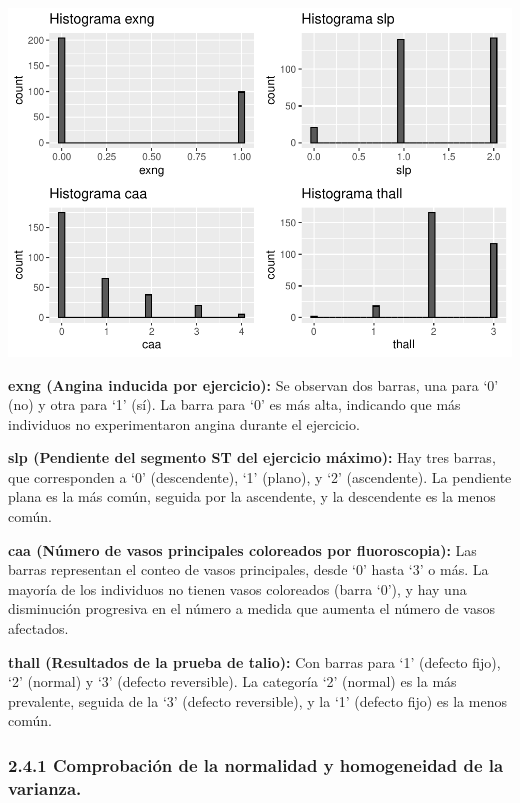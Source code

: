 \documentclass[
]{article}
\begin{document}
\includegraphics{coyolaf_ChristianOyola-PRA2_files/figure-latex/unnamed-chunk-13-1.pdf}

\textbf{exng (Angina inducida por ejercicio):} Se observan dos barras,
una para `0' (no) y otra para `1' (sí). La barra para `0' es más alta,
indicando que más individuos no experimentaron angina durante el
ejercicio.

\textbf{slp (Pendiente del segmento ST del ejercicio máximo):} Hay tres
barras, que corresponden a `0' (descendente), `1' (plano), y `2'
(ascendente). La pendiente plana es la más común, seguida por la
ascendente, y la descendente es la menos común.

\textbf{caa (Número de vasos principales coloreados por fluoroscopia):}
Las barras representan el conteo de vasos principales, desde `0' hasta
`3' o más. La mayoría de los individuos no tienen vasos coloreados
(barra `0'), y hay una disminución progresiva en el número a medida que
aumenta el número de vasos afectados.

\textbf{thall (Resultados de la prueba de talio):} Con barras para `1'
(defecto fijo), `2' (normal) y `3' (defecto reversible). La categoría
`2' (normal) es la más prevalente, seguida de la `3' (defecto
reversible), y la `1' (defecto fijo) es la menos común.

\hypertarget{comprobaciuxf3n-de-la-normalidad-y-homogeneidad-de-la-varianza.}{%
\subsubsection{2.4.1 Comprobación de la normalidad y homogeneidad de la
varianza.}\label{comprobaciuxf3n-de-la-normalidad-y-homogeneidad-de-la-varianza.}}
\end{document}
